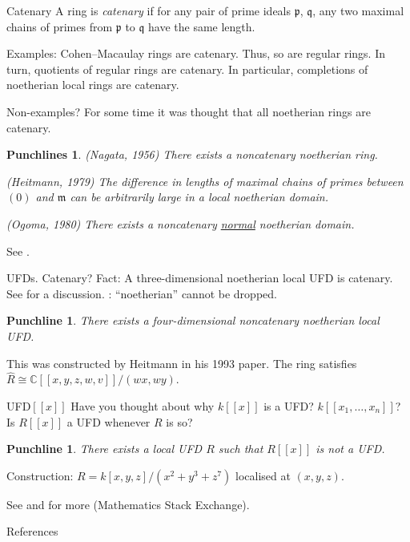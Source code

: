 \documentclass{beamer}
\newtheorem{punchline}[theorem]{Punchline}
\newtheorem{punchlines}[theorem]{Punchlines}
\begin{document}
	\begin{frame}{Catenary}
		A ring is \emph{catenary} if for any pair of prime ideals $\mathfrak{p}$, $\mathfrak{q}$, \pause any two maximal chains of primes from $\mathfrak{p}$ to $\mathfrak{q}$ \pause have the same length. \pause %

		Examples: Cohen--Macaulay rings are catenary. \pause Thus, so are regular rings. \pause In turn, quotients of regular rings are catenary. \pause In particular, completions of noetherian local rings are catenary.
	\end{frame}
	\begin{frame}{Non-examples?}
		For some time it was thought that all noetherian rings are catenary. \pause

		\begin{punchlines} %
			(Nagata, 1956) There exists a noncatenary noetherian ring. \pause

			(Heitmann, 1979) The difference in lengths of maximal chains of primes between $(0)$ and $\mathfrak{m}$ can be arbitrarily large in a local noetherian domain. \pause

			(Ogoma, 1980) There exists a noncatenary \underline{normal} noetherian domain. 
		\end{punchlines}

		\phantom{h} \hfill {\footnotesize See \cite{NagataNoncatenary,HeitmannNoncatenary,OgomaNoncatenary}.}
	\end{frame}
	
	\begin{frame}{UFDs. Catenary?}
		Fact: A three-dimensional noetherian local UFD is catenary. \newline
		\phantom{h} \hfill {\footnotesize See \cite{MOUFD3} for a discussion.} \pause \newline
		\cite{FujitaUFDNotCatenary}: ``noetherian'' cannot be dropped. \pause 

		\begin{punchline}
			There exists a four-dimensional noncatenary noetherian local UFD.
		\end{punchline} \pause

		This was constructed by Heitmann in his 1993 paper. \pause The ring satisfies $\widehat{R} \cong \mathbb{C}[\![x, y, z, w, v]\!]/(wx, wy)$.
	\end{frame}

	\begin{frame}{\texorpdfstring{UFD$[\![x]\!]$}{UFD[[x]]}}
		Have you thought about why $k[\![x]\!]$ is a UFD? \pause $k[\![x_{1}, \ldots, x_{n}]\!]$? \pause Is $R[\![x]\!]$ a UFD whenever $R$ is so? \pause
		\begin{punchline}
			There exists a local UFD $R$ such that $R[\![x]\!]$ is not a UFD.
		\end{punchline} \pause
		Construction: $R = k[x, y, z]/(x^{2} + y^{3} + z^{7})$ localised at $(x, y, z)$.

		\phantom{h} \hfill {\tiny See \cite{MSEUFDPowerSeries} and \cite{MSEHypersurfaceUFD} for more (Mathematics Stack Exchange).}
	\end{frame}

	\begin{frame}[allowframebreaks]{References}
		\printbibliography
	\end{frame}
\end{document}

